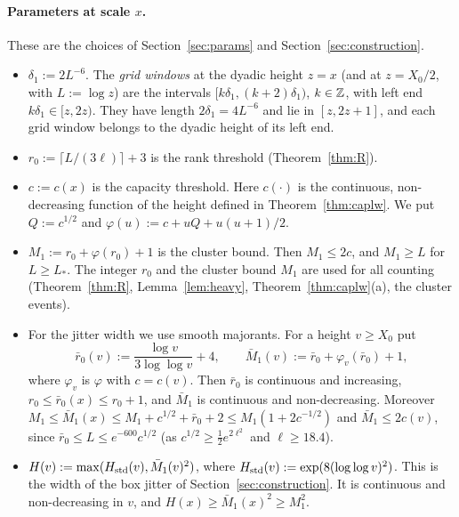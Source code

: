 \paragraph{Parameters at scale $x$.}
These are the choices of Section~\ref{sec:params} and Section~\ref{sec:construction}.
\begin{itemize}
\item $\delta_1:=2L^{-6}$. The \emph{grid windows} at the dyadic height $z=x$ (and at $z=X_0/2$, with $L:=\log z$) are the intervals $[k\delta_1,(k+2)\delta_1)$,
  $k\in\mathbb{Z}$, with left end $k\delta_1\in[z,2z)$. They have length $2\delta_1=4L^{-6}$ and lie in $[z,2z+1]$, and each grid
  window belongs to the dyadic height of its left end.
\item $r_0:=\lceil L/(3\ell)\rceil+3$ is the rank threshold (Theorem~\ref{thm:R}).
\item $c:=c(x)$ is the capacity threshold. Here $c(\cdot)$ is the continuous, non-decreasing function of the height defined
  in Theorem~\ref{thm:caplw}. We put $Q:=c^{1/2}$ and $\varphi(u):=c+uQ+u(u+1)/2$.
\item $M_1:=r_0+\varphi(r_0)+1$ is the cluster bound. Then $M_1\le 2c$, and $M_1\ge L$ for $L\ge L_*$. The integer $r_0$
  and the cluster bound $M_1$ are used for all counting (Theorem~\ref{thm:R}, Lemma~\ref{lem:heavy},
  Theorem~\ref{thm:caplw}(a), the cluster events).
\item For the jitter width we use smooth majorants. For a height $v\ge X_0$ put
  \[
  \bar r_0(v):=\frac{\log v}{3\log\log v}+4,\qquad \bar M_1(v):=\bar r_0+\varphi_v(\bar r_0)+1,
  \]
  where $\varphi_v$ is $\varphi$ with $c=c(v)$. Then $\bar r_0$ is continuous and increasing, $r_0\le\bar r_0(x)\le r_0+1$,
  and $\bar M_1$ is continuous and non-decreasing. Moreover $M_1\le\bar M_1(x)\le M_1+c^{1/2}+\bar r_0+2\le
  M_1(1+2c^{-1/2})$ and $\bar M_1\le2c(v)$, since $\bar r_0\le L\le e^{-600}c^{1/2}$ (as $c^{1/2}\ge\tfrac12e^{2\ell^2}$ and
  $\ell\ge18.4$).
\item $H(v):=\max(H_{\mathrm{std}}(v),\bar M_1(v)^2)$, where $H_{\mathrm{std}}(v):=\exp(8(\log\log v)^2)$. This is the width of the box jitter
  of Section~\ref{sec:construction}. It is continuous and non-decreasing in $v$, and $H(x)\ge\bar M_1(x)^2\ge M_1^2$.
  \begin{itemize}

\end{itemize}
\end{itemize}
